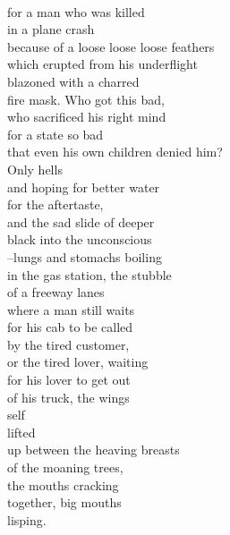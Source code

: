 \documentclass[smalldemyvopaper,11pt,twoside,onecolumn,openright,extrafontsizes]{memoir}
\begin{document}
\\for a man who was killed
\\in a plane crash
\\because of a loose loose loose feathers
\\which erupted from his underflight
\\blazoned with a charred
\\fire mask. Who got this bad,
\\who sacrificed his right mind
\\for a state so bad
\\that even his own children denied him?
\\Only hells
\\and hoping for better water
\\for the aftertaste,
\\and the sad slide of deeper
\\black into the unconscious
\\--lungs and stomachs boiling
\\in the gas station, the stubble
\\of a freeway lanes
\\where a man still waits
\\for his cab to be called
\\by the tired customer,
\\or the tired lover, waiting
\\for his lover to get out
\\of his truck, the wings
\\self
\\lifted
\\up between the heaving breasts
\\of the moaning trees,
\\the mouths cracking
\\together, big mouths
\\lisping.
\end{document}

